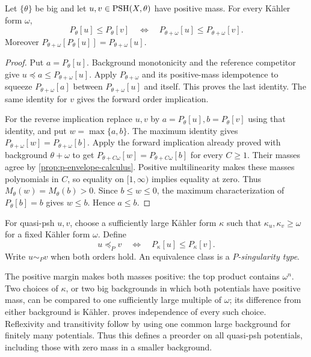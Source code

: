 \begin{lemma}\label{lem:p-order-background-addition}
Let $\{\theta\}$ be big and let $u,v\in\mathrm{PSH}(X,\theta)$ have positive mass. For every K\"ahler form $\omega$,
\[
 P_\theta[u]\leq P_\theta[v]
 \quad\Longleftrightarrow\quad
 P_{\theta+\omega}[u]\leq P_{\theta+\omega}[v].
\]
Moreover $P_{\theta+\omega}[P_\theta[u]]=P_{\theta+\omega}[u]$.
\end{lemma}
\begin{proof}
Put $a=P_\theta[u]$. Background monotonicity and the reference competitor give
$u\preceq a\leq P_{\theta+\omega}[u]$. Apply $P_{\theta+\omega}$ and its positive-mass idempotence to squeeze $P_{\theta+\omega}[a]$ between $P_{\theta+\omega}[u]$ and itself. This proves the last identity. The same identity for $v$ gives the forward order implication.

For the reverse implication replace $u,v$ by $a=P_\theta[u],b=P_\theta[v]$ using that identity, and put $w=\max\{a,b\}$. The maximum identity gives $P_{\theta+\omega}[w]=P_{\theta+\omega}[b]$. Apply the forward implication already proved with background $\theta+\omega$ to get
$P_{\theta+C\omega}[w]=P_{\theta+C\omega}[b]$ for every $C\geq1$. Their masses agree by \cref{prop:p-envelope-calculus}. Positive multilinearity makes these masses polynomials in $C$, so equality on $[1,\infty)$ implies equality at zero. Thus $M_\theta(w)=M_\theta(b)>0$. Since $b\leq w\leq0$, the maximum characterization of $P_\theta[b]=b$ gives $w\leq b$. Hence $a\leq b$.
\end{proof}

\begin{definition}\label{def:global-p-singularity-order}
For quasi-psh $u,v$, choose a sufficiently large K\"ahler form $\kappa$ such that $\kappa_u,\kappa_v\geq\omega$ for a fixed K\"ahler form $\omega$. Define
\[
 u\preceq_P v\quad\Longleftrightarrow\quad
 P_\kappa[u]\leq P_\kappa[v].
\]
Write $u\sim_P v$ when both orders hold. An equivalence class is a \emph{$P$-singularity type}.
\end{definition}

The positive margin makes both masses positive: the top product contains $\omega^n$. Two choices of $\kappa$, or two big backgrounds in which both potentials have positive mass, can be compared to one sufficiently large multiple of $\omega$; its difference from either background is K\"ahler.  proves independence of every such choice. Reflexivity and transitivity follow by using one common large background for finitely many potentials. Thus this defines a preorder on all quasi-psh potentials, including those with zero mass in a smaller background.

